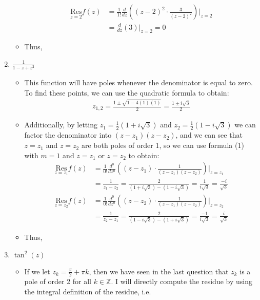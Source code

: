 \documentclass[10pt,a4paper]{article}
\theoremstyle{definition}
\begin{document}
\begin{enumerate}[label = (\alph*)]
\begin{itemize}
	\begin{align*}
	\underset{z = 2}{\text{Res}}f(z) &= \frac{1}{1!}\frac{d}{dz}\left((z - 2)^2 \cdot \frac{3}{(z - 2)^2}\right)\bigg|_{z = 2}\\
	&= \frac{d}{dz}\left(3\right)\bigg|_{z = 2} = 0
	\end{align*}
	\item Thus, 
	\end{itemize}
\item $\displaystyle \frac{1}{1 - z + z^2}$
	\begin{itemize}
	\item This function will have poles whenever the denominator is equal to zero. To find these points, we can use the quadratic formula to obtain:
	\begin{align*}
	z_{1,2} = \frac{1 \pm \sqrt{1 - 4(1)(1)}}{2} = \frac{1 \pm i\sqrt{3}}{2}
	\end{align*}
	\item Additionally, by letting $z_1 = \frac{1}{2}\left(1 + i\sqrt{3}\right)$ and $z_2 = \frac{1}{2}\left(1 - i\sqrt{3}\right)$ we can factor the denominator into $(z - z_1)(z - z_2)$, and we can see that $z = z_1$ and $z = z_2$ are both poles of order 1, so we can use formula (1) with $m = 1$ and $z = z_1$ or $z = z_2$ to obtain:
	\begin{align*}
	\underset{z = z_1}{\text{Res}}f(z) &= \frac{1}{0!}\frac{d^0}{dz^0}\left((z - z_1)\cdot \frac{1}{(z - z_1)(z - z_2)}\right) \bigg|_{z = z_1}\\
	&= \frac{1}{z_1 - z_2} = \frac{2}{(1 + i\sqrt{3}) - (1 - i\sqrt{3})} = \frac{1}{i\sqrt{3}} = \frac{-i}{\sqrt{3}}\\
	\underset{z = z_2}{\text{Res}}f(z) &= \frac{1}{0!}\frac{d^0}{dz^0}\left((z - z_2)\cdot \frac{1}{(z - z_1)(z - z_2)}\right) \bigg|_{z = z_2}\\
	&= \frac{1}{z_2 - z_1} = \frac{2}{(1 - i\sqrt{3}) - (1 + i\sqrt{3})} = \frac{-1}{i\sqrt{3}} = \frac{i}{\sqrt{3}}
	\end{align*}
	\item Thus, 
	\end{itemize}
\item $\tan^2(z)$
	\begin{itemize}
	\item If we let $z_k = \frac{\pi}{2} + \pi k$, then we have seen in the last question that $z_k$ is a pole of order 2 for all $k \in \mathbb{Z}$. I will directly compute the residue by using the integral definition of the residue, i.e. 

\end{itemize}
\end{enumerate}
\end{document}
